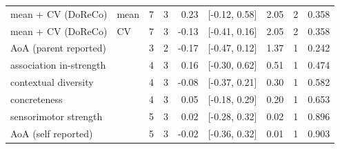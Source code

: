 \begin{table}[ht]
\begin{tabular}{llrrrlrrl}
  mean + CV (DoReCo) & mean & 7 & 3 & 0.23 & [-0.12, 0.58] & 2.05 & 2 & 0.358 \\ 
  mean + CV (DoReCo) & CV & 7 & 3 & -0.13 & [-0.41, 0.16] & 2.05 & 2 & 0.358 \\ 
  AoA (parent reported) &  & 3 & 2 & -0.17 & [-0.47, 0.12] & 1.37 & 1 & 0.242 \\ 
  association in-strength &  & 4 & 3 & 0.16 & [-0.30, 0.62] & 0.51 & 1 & 0.474 \\ 
  contextual diversity &  & 4 & 3 & -0.08 & [-0.37, 0.21] & 0.30 & 1 & 0.582 \\ 
  concreteness &  & 4 & 3 & 0.05 & [-0.18, 0.29] & 0.20 & 1 & 0.653 \\ 
  sensorimotor strength &  & 5 & 3 & 0.02 & [-0.28, 0.32] & 0.02 & 1 & 0.896 \\ 
  AoA (self reported) &  & 5 & 3 & -0.02 & [-0.36, 0.32] & 0.01 & 1 & 0.903 \\ 
   \hline
\end{tabular}
\end{table}
